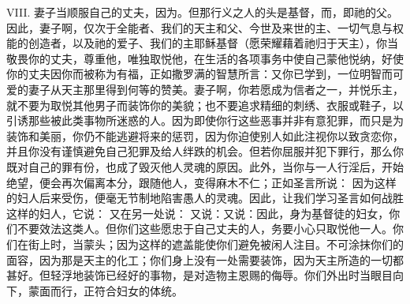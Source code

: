 VIII. 妻子当顺服自己的丈夫，因为。但那行义之人的头是基督，而，即祂的父。因此，妻子啊，仅次于全能者、我们的天主和父、今世及来世的主、一切气息与权能的创造者，以及祂的爱子、我们的主耶稣基督（愿荣耀藉着祂归于天主），你当敬畏你的丈夫，尊重他，唯独取悦他，在生活的各项事务中使自己蒙他悦纳，好使你的丈夫因你而被称为有福，正如撒罗满的智慧所言：又你已学到，一位明智而可爱的妻子从天主那里得到何等的赞美。妻子啊，你若愿成为信者之一，并悦乐主，就不要为取悦其他男子而装饰你的美貌；也不要追求精细的刺绣、衣服或鞋子，以引诱那些被此类事物所迷惑的人。因为即使你行这些恶事并非有意犯罪，而只是为装饰和美丽，你仍不能逃避将来的惩罚，因为你迫使别人如此注视你以致贪恋你，并且你没有谨慎避免自己犯罪及给人绊跌的机会。但若你屈服并犯下罪行，那么你既对自己的罪有份，也成了毁灭他人灵魂的原因。此外，当你与一人行淫后，开始绝望，便会再次偏离本分，跟随他人，变得麻木不仁；正如圣言所说： 因为这样的妇人后来受伤，便毫无节制地陷害愚人的灵魂。因此，让我们学习圣言如何战胜这样的妇人，它说： 又在另一处说： 又说：又说：因此，身为基督徒的妇女，你们不要效法这类人。但你们这些愿忠于自己丈夫的人，务要小心只取悦他一人。你们在街上时，当蒙头；因为这样的遮盖能使你们避免被闲人注目。不可涂抹你们的面容，因为那是天主的化工；你们身上没有一处需要装饰，因为天主所造的一切都甚好。但轻浮地装饰已经好的事物，是对造物主恩赐的侮辱。你们外出时当眼目向下，蒙面而行，正符合妇女的体统。\par

